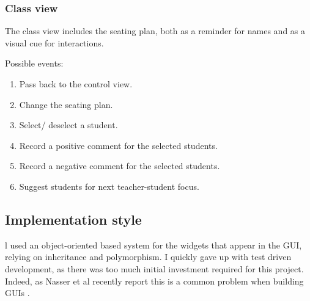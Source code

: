 \documentclass[10pt]{article}
\begin{document}
\subsubsection{Class view}

The class view includes the seating plan, both as a reminder for names and as a visual cue for interactions.

\begin{center}
\end{center}

Possible events: 
\begin{enumerate}
\item Pass back to the control view.
\item Change the seating plan.
\item Select/ deselect a student.
\item Record a positive comment for the selected students.
\item Record a negative comment  for the selected students.
\item Suggest students for next teacher-student focus.
\end{enumerate}

\subsection{Implementation style}
l used an object-oriented based system for the widgets that appear in the GUI, relying on inheritance and polymorphism. I quickly gave up with test driven development, as there was too much initial investment required for this project. Indeed, as Nasser et al recently report this is a common problem when building GUIs \cite{Nass21}.
\end{document}
